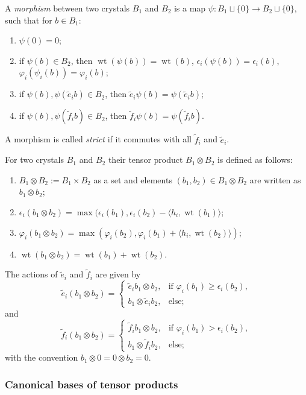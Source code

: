 \documentclass[final]{amsart}
\theoremstyle{plain}
\theoremstyle{definition}
\newcommand{\te}{\tilde e}
\newcommand{\tf}{\tilde f}
\DeclareMathOperator{\weight}{wt}
\begin{document}
A \emph{morphism} between two crystals $B_1$ and $B_2$ is a map $\psi\colon B_1 \sqcup \{0\} \to B_2 \sqcup \{0\}$, such that for $b \in B_1$:
\begin{enumerate}
    \item $\psi(0) = 0$;
    \item if $\psi(b)\in B_2$, then $\weight(\psi(b)) = \weight(b)$, $\epsilon_i(\psi(b)) = \epsilon_i(b)$, $\varphi_i(\psi_i(b)) = \varphi_i(b)$;
    \item if $\psi(b), \psi(\te_i b) \in B_2$, then $\te_i \psi(b) = \psi(\te_i b)$;
    \item if $\psi(b), \psi(\tf_i b) \in B_2$, then $\tf_i \psi(b) = \psi(\tf_i b)$.
\end{enumerate}
A morphism is called \emph{strict} if it commutes with all $\tf_i$ and $\te_i$.

For two crystals $B_1$ and $B_2$ their tensor product $B_1 \otimes B_2$ is defined as follows:
\begin{enumerate}
    \item $B_1 \otimes B_2 := B_1 \times B_2$ as a set and elements $(b_1, b_2) \in B_1 \otimes B_2$ are written as $b_1 \otimes b_2$;
    \item $\epsilon_i(b_1 \otimes b_2) = \max(\epsilon_i(b_1), \epsilon_i(b_2) - \langle h_i, \weight(b_1)\rangle$;
    \item $\varphi_i(b_1 \otimes b_2) = \max(\varphi_i(b_2), \varphi_i(b_1) + \langle h_i, \weight(b_2)\rangle)$;
    \item $\weight(b_1 \otimes b_2) = \weight(b_1) + \weight(b_2)$.
\end{enumerate}
The actions of $\te_i$ and $\tf_i$ are given by
\[
	\te_i (b_1\otimes b_2) =
	\begin{cases}
		\te_i b_1 \otimes b_2, & \text{if } \varphi_i(b_1) \ge \epsilon_i(b_2), \\
		b_1\otimes \te_i b_2, & \text{else};
	\end{cases}
\]
and
\[
	\tf_i (b_1\otimes b_2) =
	\begin{cases}
			\tf_i b_1 \otimes b_2, & \text{if } \varphi_i(b_1) > \epsilon_i(b_2), \\
			b_1\otimes \tf_i b_2, & \text{else};
	\end{cases}
\]
with the convention $b_1 \otimes 0 = 0 \otimes b_2 = 0$.

\subsubsection*{Canonical bases of tensor products}
\label{section:tensor-product-canonical-bases}
\end{document}
